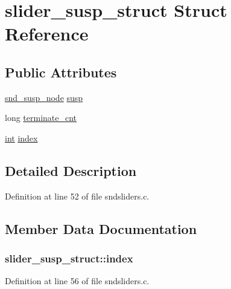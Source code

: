 \hypertarget{structslider__susp__struct}{}\section{slider\+\_\+susp\+\_\+struct Struct Reference}
\label{structslider__susp__struct}
\subsection*{Public Attributes}
\begin{DoxyCompactItemize}
\item 
\hyperlink{sound_8h_a6b268203688a934bd798ceb55f85d4c0}{snd\+\_\+susp\+\_\+node} \hyperlink{structslider__susp__struct_aa91890d9674d9b05523fcd72d8fd41e9}{susp}
\item 
long \hyperlink{structslider__susp__struct_afb6e303d2494ef01bb2a6e29f41830d6}{terminate\+\_\+cnt}
\item 
\hyperlink{xmltok_8h_a5a0d4a5641ce434f1d23533f2b2e6653}{int} \hyperlink{structslider__susp__struct_a7c8bd833766b1abac89cd7081c74e41f}{index}
\end{DoxyCompactItemize}


\subsection{Detailed Description}


Definition at line 52 of file sndsliders.\+c.



\subsection{Member Data Documentation}
\subsubsection[{\texorpdfstring{index}{index}}]{ slider\+\_\+susp\+\_\+struct\+::index}\hypertarget{structslider__susp__struct_a7c8bd833766b1abac89cd7081c74e41f}{}\label{structslider__susp__struct_a7c8bd833766b1abac89cd7081c74e41f}


Definition at line 56 of file sndsliders.\+c.

